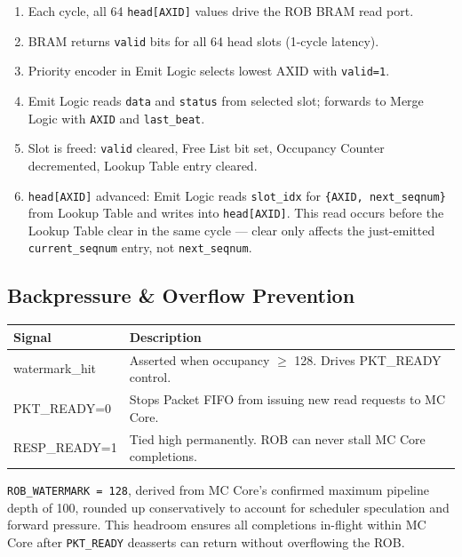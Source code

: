 \begin{enumerate}[noitemsep]
  \item Each cycle, all 64 \texttt{head[AXID]} values drive the ROB BRAM read port.
  \item BRAM returns \texttt{valid} bits for all 64 head slots (1-cycle latency).
  \item Priority encoder in Emit Logic selects lowest AXID with \texttt{valid=1}.
  \item Emit Logic reads \texttt{data} and \texttt{status} from selected slot; forwards to Merge Logic with \texttt{AXID} and \texttt{last\_beat}.
  \item Slot is freed: \texttt{valid} cleared, Free List bit set, Occupancy Counter decremented, Lookup Table entry cleared.
  \item \texttt{head[AXID]} advanced: Emit Logic reads \texttt{slot\_idx} for \texttt{\{AXID, next\_seqnum\}} from Lookup Table and writes into \texttt{head[AXID]}. This read occurs before the Lookup Table clear in the same cycle — clear only affects the just-emitted \texttt{current\_seqnum} entry, not \texttt{next\_seqnum}.
\end{enumerate}

\subsection{Backpressure \& Overflow Prevention}

\begin{center}
\begin{tabularx}{\textwidth}{>{\ttfamily}l X}
\toprule
\textbf{Signal} & \textbf{Description} \\
\midrule
watermark\_hit  & Asserted when occupancy $\geq$ 128. Drives PKT\_READY control. \\
PKT\_READY=0    & Stops Packet FIFO from issuing new read requests to MC Core. \\
RESP\_READY=1   & Tied high permanently. ROB can never stall MC Core completions. \\
\bottomrule
\end{tabularx}
\end{center}

\medskip
\noindent \texttt{ROB\_WATERMARK = 128}, derived from MC Core's confirmed maximum pipeline depth of 100, rounded up conservatively to account for scheduler speculation and forward pressure. This headroom ensures all completions in-flight within MC Core after \texttt{PKT\_READY} deasserts can return without overflowing the ROB.

